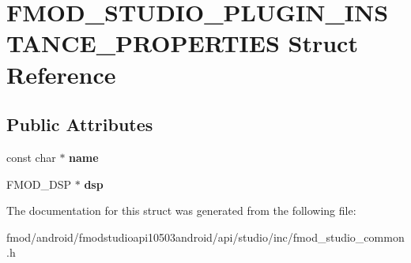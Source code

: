 \hypertarget{struct_f_m_o_d___s_t_u_d_i_o___p_l_u_g_i_n___i_n_s_t_a_n_c_e___p_r_o_p_e_r_t_i_e_s}{\section{F\+M\+O\+D\+\_\+\+S\+T\+U\+D\+I\+O\+\_\+\+P\+L\+U\+G\+I\+N\+\_\+\+I\+N\+S\+T\+A\+N\+C\+E\+\_\+\+P\+R\+O\+P\+E\+R\+T\+I\+E\+S Struct Reference}
\label{struct_f_m_o_d___s_t_u_d_i_o___p_l_u_g_i_n___i_n_s_t_a_n_c_e___p_r_o_p_e_r_t_i_e_s}
}
\subsection*{Public Attributes}
\begin{DoxyCompactItemize}
\item 
\hypertarget{struct_f_m_o_d___s_t_u_d_i_o___p_l_u_g_i_n___i_n_s_t_a_n_c_e___p_r_o_p_e_r_t_i_e_s_ac4e14c9b9c788cf766ffcdf9c4204e70}{const char $\ast$ {\bfseries name}}\label{struct_f_m_o_d___s_t_u_d_i_o___p_l_u_g_i_n___i_n_s_t_a_n_c_e___p_r_o_p_e_r_t_i_e_s_ac4e14c9b9c788cf766ffcdf9c4204e70}

\item 
\hypertarget{struct_f_m_o_d___s_t_u_d_i_o___p_l_u_g_i_n___i_n_s_t_a_n_c_e___p_r_o_p_e_r_t_i_e_s_a139ff81d6ecf551ae386c88c55c3a340}{F\+M\+O\+D\+\_\+\+D\+S\+P $\ast$ {\bfseries dsp}}\label{struct_f_m_o_d___s_t_u_d_i_o___p_l_u_g_i_n___i_n_s_t_a_n_c_e___p_r_o_p_e_r_t_i_e_s_a139ff81d6ecf551ae386c88c55c3a340}

\end{DoxyCompactItemize}


The documentation for this struct was generated from the following file\+:\begin{DoxyCompactItemize}
\item 
fmod/android/fmodstudioapi10503android/api/studio/inc/fmod\+\_\+studio\+\_\+common.\+h\end{DoxyCompactItemize}
